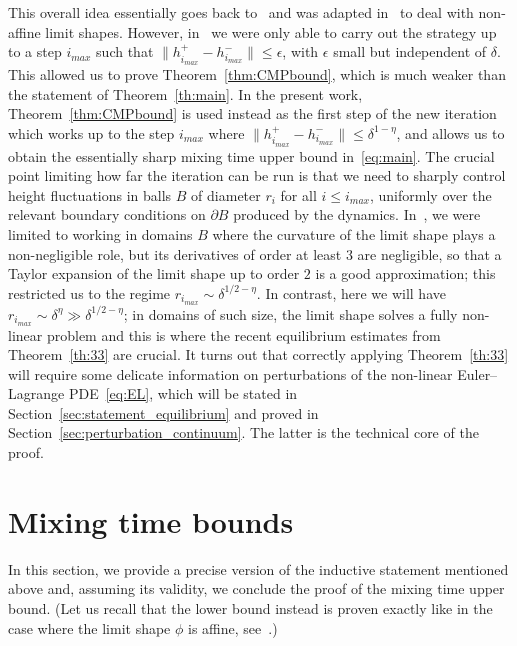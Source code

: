 \documentclass[10pt]{amsart}
\theoremstyle{definition}\newtheorem{defi}[theo]{Definition}\newtheorem{rema}[theo]{Remark}\newtheorem{exam}[theo]{Example}\newtheorem{exem}[theo]{Example}\newtheorem{nota}[theo]{Notation}
\begin{document}
This overall idea essentially goes back to~\cite{CMT} and was adapted in~\cite{LT_cmp} to deal with non-affine limit shapes. However, in~\cite{LT_cmp} we were only able to carry out the strategy up to a step $i_{max}$ such that $\| h^+_{i_{max}} - h^-_{i_{max}} \|\le \epsilon$, with $\epsilon$ small but independent of $\delta$. This allowed us to prove
Theorem~\ref{thm:CMPbound}, which is much weaker than the statement of Theorem~\ref{th:main}. In the present work, Theorem~\ref{thm:CMPbound} is used instead as the first step of the new iteration which works up to the step $i_{max}$ where $\| h^+_{i_{max}} - h^-_{i_{max}} \|\le \delta^{1-\eta}$, and allows us to obtain the essentially sharp mixing time upper bound in~\eqref{eq:main}. The crucial point limiting how far the iteration can be run is that we need to sharply control height fluctuations in balls $B$ of diameter $r_i$ for all $i\le i_{max}$, uniformly over the relevant boundary conditions on $\partial B$ produced by the dynamics. In~\cite{LT_cmp}, we were limited to working in domains $B$ where the curvature of the limit shape plays a non-negligible role, but its derivatives of order at least $3$ are negligible, so that a Taylor expansion of the limit shape up to order $2$ is a good approximation; this restricted us to the regime $r_{i_{max}} \sim \delta^{1/2-\eta}$. In contrast, here we will have $r_{i_{max}} \sim \delta^{\eta}\gg \delta^{1/2-\eta}$; in domains of such size, the limit shape solves a fully non-linear problem and this is where the recent equilibrium estimates from Theorem~\ref{th:33} are crucial. It turns out that correctly applying Theorem~\ref{th:33} will require some delicate information on perturbations of the non-linear Euler--Lagrange PDE~\eqref{eq:EL}, which will be stated in
Section~\ref{sec:statement_equilibrium} and proved in
Section~\ref{sec:perturbation_continuum}. The latter is the technical core of the proof.



\section{Mixing time bounds}\label{sec:UB}

In this section, we provide a precise version of the inductive statement mentioned above and, assuming its validity, we conclude the proof of the mixing time upper bound. (Let us recall that the lower bound instead is proven exactly like in the case where the limit shape $\phi$ is affine, see~\cite[Sec.~5.2]{LT_ptrf}.)
\end{document}
